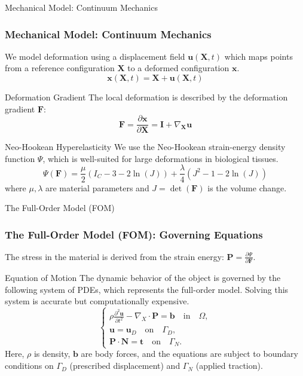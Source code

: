\documentclass{beamer}
\begin{document}
\begin{frame}{Mechanical Model: Continuum Mechanics}
    \frametitle{Mechanical Model: Continuum Mechanics}
    
    We model deformation using a displacement field \(\bm{u}(\bm{X},t)\) which maps points from a reference configuration \(\bm{X}\) to a deformed configuration \(\bm{x}\).
    \begin{equation*}
        \bm{x}(\bm{X},t) = \bm{X} + \bm{u}(\bm{X},t)
    \end{equation*}

    \begin{block}{Deformation Gradient}
        The local deformation is described by the deformation gradient \(\bm{F}\):
        \begin{equation}
            \bm{F} = \frac{\partial \bm{x}}{\partial \bm{X}} = \bm{I} + \nabla_{\mathbf{X}} \bm{u}
        \end{equation}
    \end{block}
    
    \begin{block}{Neo-Hookean Hyperelasticity}
        We use the Neo-Hookean strain-energy density function $\Psi$, which is well-suited for large deformations in biological tissues.
        \begin{equation}
            \Psi(\bm{F}) = \frac{\mu}{2} (I_C - 3 - 2\ln(J)) + \frac{\lambda}{4} (J^2 - 1 - 2\ln(J))
        \end{equation}
        where \(\mu, \lambda\) are material parameters and \(J = \det(\bm{F})\) is the volume change.
    \end{block}
\end{frame}

\begin{frame}{The Full-Order Model (FOM)}
    \frametitle{The Full-Order Model (FOM): Governing Equations}
    
    The stress in the material is derived from the strain energy: \(\bm{P} = \frac{\partial \Psi}{\partial \bm{F}}\).
    
    \begin{block}{Equation of Motion}
        The dynamic behavior of the object is governed by the following system of PDEs, which represents the full-order model. Solving this system is accurate but computationally expensive.
        \begin{equation}
            \begin{cases}
                \rho \frac{\partial^2 \bm{u}}{\partial t^2} - \nabla_X \cdot \bm{P} = \bm{b} \quad \text{in} \quad \Omega, \\
                \bm{u} = \bm{u}_D \quad \text{on} \quad \Gamma_D, \\
                \bm{P} \cdot \bm{N} = \bm{t} \quad \text{on} \quad \Gamma_N.
            \end{cases}
        \end{equation}
        Here, \(\rho\) is density, \(\bm{b}\) are body forces, and the equations are subject to boundary conditions on \(\Gamma_D\) (prescribed displacement) and \(\Gamma_N\) (applied traction).
    \end{block}
\end{frame}
\end{document}
